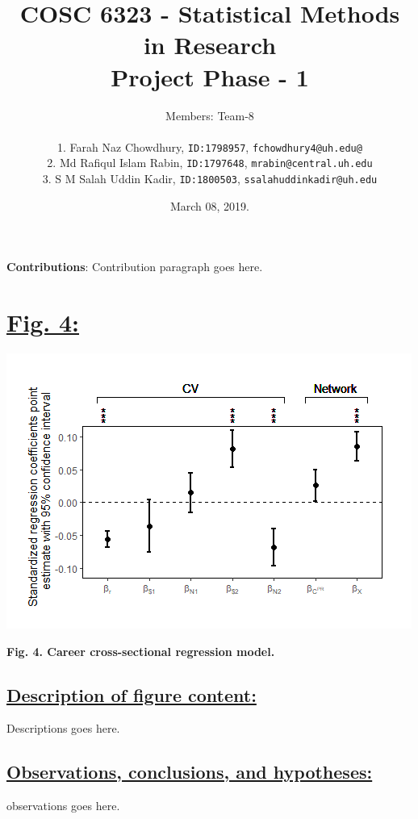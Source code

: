 \documentclass{article}\usepackage[]{graphicx}\usepackage[]{color}
\title{COSC 6323 - Statistical Methods in Research\\Project Phase - 1\\}
\author{%
    Members: Team-8 \\\\
    1. Farah Naz Chowdhury, \texttt  {ID:1798957}, \texttt{fchowdhury4@uh.edu@}\vspace{2pt} \\
    2. Md Rafiqul Islam Rabin, \texttt{ID:1797648}, \texttt{mrabin@central.uh.edu}\vspace{2pt} \\
    3. S M Salah Uddin Kadir, \texttt{ID:1800503}, \texttt{ssalahuddinkadir@uh.edu}\vspace{2pt} \\
}
\date{March 08, 2019.}
\begin{document}
\maketitle
\par{\textbf{Contributions}: Contribution paragraph goes here.}

\newpage
\section*{\underline{Fig. 4:}}
\begin{center}
\includegraphics[scale=1.0]{4.png}
\newline
\par{\textbf{Fig. 4. Career cross-sectional regression model.}}
\end{center}
\subsection*{\underline{Description of figure content:}}
\par{
Descriptions goes here.
}
\subsection*{\underline{Observations, conclusions, and hypotheses:}}
\par{
observations goes here.
}

\newpage
\end{document}
